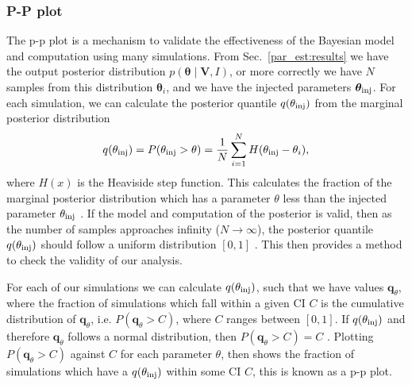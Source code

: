 \subsubsection{P-P plot}

The p-p plot is a mechanism to validate the effectiveness of the Bayesian model and computation using many simulations.
From Sec.~\ref{par_est:results} we have the output posterior distribution $p(\bm{\theta} \mid \bm{V}, I)$, or more correctly we have $N$ samples from this distribution $\bm{\theta}_i$, and we have the injected parameters $\bm{\theta}_{\rm{inj}}$.
For each simulation, we can calculate the posterior quantile $q(\theta_{\rm{inj}})$ from the marginal posterior distribution
\begin{equation}
    q(\theta_{\rm{inj}}) = P(\theta_{\rm{inj}} > \theta) = \frac{1}{N} \sum_{i=1}^{N} H(\theta_{\rm{inj}} - \theta_i),
\end{equation}
where $H(x)$ is the Heaviside step function. 
This calculates the fraction of the marginal posterior distribution which has a parameter $\theta$ less than the injected parameter $\theta_{\rm{inj}}$ \citep{cook2006ValidationSoftware}.
If the model and computation of the posterior is valid, then as the number of samples approaches infinity ($N \rightarrow \infty$), the posterior quantile $q(\theta_{\rm{inj}})$ should follow a uniform distribution $[0,1]$ \citep{cook2006ValidationSoftware}.
This then provides a method to check the validity of our analysis.

For each of our simulations we can calculate $q(\theta_{\rm{inj}})$, such that we have values $\bm{q}_{\theta}$, where the fraction of simulations which fall within a given \gls{CI} $C$ is the cumulative distribution of $\bm{q}_{\theta}$, i.e. $P(\bm{q}_{\theta} > C)$, where $C$ ranges between $[0,1]$.
If $q(\theta_{\rm{inj}})$ and therefore $\bm{q}_{\theta}$ follows a normal distribution, then $P(\bm{q}_{\theta} > C) = C$ \citep{cook2006ValidationSoftware}.
Plotting $P(\bm{q}_{\theta} > C)$ against $C$ for each parameter $\theta$, then shows the fraction of simulations which have a $q(\theta_{\rm{inj}})$ within some \gls{CI} $C$, this is known as a p-p plot.

